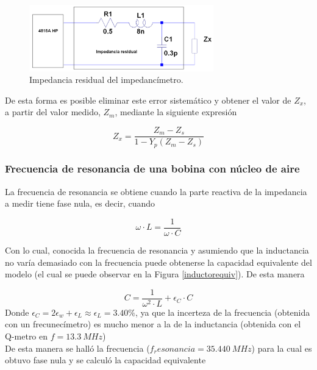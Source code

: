 \documentclass[a4paper,10pt]{article}
\begin{document}
		\begin{figure}[!htb]
			\centering
			\includegraphics[width=8cm]
			{Imagenes/impedanciares.png}
			\caption{Impedancia residual del impedanc\'imetro.}
			\label{impres} 
		\end{figure}
		
		\indent De esta forma es posible eliminar este error sistem\'atico y 
		obtener el valor de $Z_x$, a partir del valor medido, $Z_m$, mediante la
		siguiente expresi\'on
		
		$$Z_x=\frac{Z_m-Z_s}{1-Y_p(Z_m-Z_s)}$$
		
		\subsubsection{Frecuencia de resonancia de una bobina con n\'ucleo de 
		aire}
		
		\indent La frecuencia de resonancia se obtiene cuando la parte reactiva 
		de la impedancia a medir tiene fase nula, es decir, cuando
		
		$$\omega\cdot L=\frac{1}{\omega \cdot C}$$
		
		\indent Con lo cual, conocida la frecuencia de resonancia y asumiendo 
		que la inductancia no var\'ia demasiado con la frecuencia puede 
		obtenerse la capacidad equivalente del modelo (el cual se puede observar
		en la Figura \ref{inductorequiv}). De esta manera
		
		$$C=\frac{1}{\omega^2 \cdot L}+\epsilon_C \cdot C$$
		\indent Donde $\epsilon_C=2\epsilon_w+\epsilon_L\approx \epsilon_L =
		3.40\%$, ya que la incerteza de la frecuencia (obtenida con un 
		frecunec\'imetro) es mucho menor a la de la inductancia (obtenida con el
		Q-metro en $f=13.3~MHz$) \\
		\indent De esta manera se hall\'o la frecuencia ($f_resonancia=
		35.440~MHz$) para la cual es obtuvo fase nula y se calcul\'o la 
		capacidad equivalente
		
\end{document}
